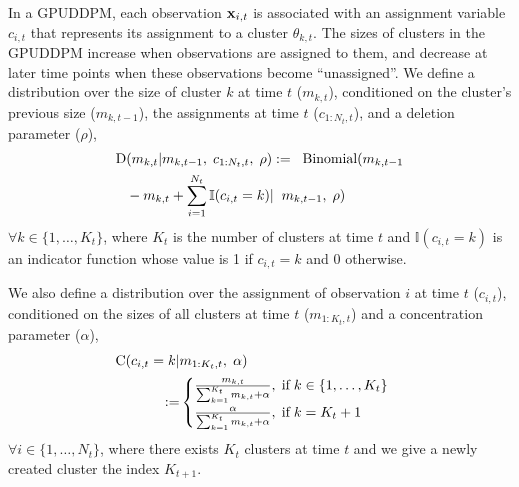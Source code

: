 \documentclass[twocolumn, final]{svjour3}
\begin{document}
In a GPUDDPM, each observation $\bold{x}_{i,t}$ is associated with an assignment variable $c_{i,t}$ that represents its assignment to a cluster $\theta_{k,t}$.
The sizes of clusters in the GPUDDPM increase when observations are assigned to them, and decrease at later time points when these observations become ``unassigned''. We define a distribution over the size of cluster $k$ at time $t$ ($m_{k,t}$), conditioned on the cluster's previous size ($m_{k,t-1}$), the assignments at time $t$ ($c_{1:N_{t}, t}$), and a deletion parameter ($\rho$),
\begin{equation}
\begin{split}
\label{D_distro}
\text{D} &(m_{k,t} | m_{k,t-1}, \hspace{1mm} c_{1:N_{t}, t}, \hspace{1mm} \rho) := \hspace{2mm} \text{Binomial}( m_{k,t-1}  \\
&- m_{k,t} + \sum_{i=1}^{N_{t}} \mathbb{I}(c_{i,t} = k) | \hspace{2mm} {m_{k,t-1}, \hspace{1mm} \rho})
\end{split}
\end{equation}
$\forall k \in \{1, \ldots, K_{t} \}$, where $K_{t}$ is the number of clusters at time $t$ and $\mathbb{I}(c_{i,t} = k)$ is an indicator function whose value is 1 if $c_{i,t} = k$ and 0 otherwise.

We also define a distribution over the assignment of observation $i$ at time $t$ ($c_{i,t}$), conditioned on the sizes of all clusters at time $t$ ($m_{1:K_{t},t}$) and a concentration parameter ($\alpha$),
\begin{equation}
\begin{split}
\label{C_distro}
\text{C} ( c_{i,t} = k | &m_{1:K_{t},t}, \hspace{1mm} \alpha)\\ :=
& \begin{cases}
\frac{m_{k,t}}{\sum_{k=1}^{K_{t}} m_{k,t} + \alpha}, \hspace{1mm} \text{if} \hspace{1mm} k \in \{ 1, \ldots, K_{t} \} \\
\frac{\alpha}{\sum_{k=1}^{K_{t}} m_{k,t} + \alpha}, \hspace{1mm} \text{if} \hspace{1mm} k = K_{t} + 1
\end{cases}
\end{split}
\end{equation}
$\forall i \in \{1, \ldots, N_{t} \}$, where there exists $K_{t}$ clusters at time $t$ and we give a newly created cluster the index $K_{t+1}$.
\end{document}
